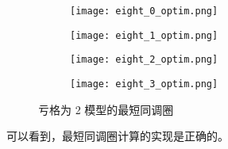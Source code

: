 \begin{figure}[h]
    \centering
    \begin{subfigure}{.2\textwidth}
        \centering
        \texttt{[image: eight\_0\_optim.png]}
    \end{subfigure}
    \begin{subfigure}{.2\textwidth}
        \centering
        \texttt{[image: eight\_1\_optim.png]}
    \end{subfigure}
    \begin{subfigure}{.2\textwidth}
        \centering
        \texttt{[image: eight\_2\_optim.png]}
    \end{subfigure}
    \begin{subfigure}{.2\textwidth}
        \centering
        \texttt{[image: eight\_3\_optim.png]}
    \end{subfigure}
    \caption{亏格为 2 模型的最短同调圈}
    \label{fig:eighthim}
\end{figure}

可以看到，最短同调圈计算的实现是正确的。